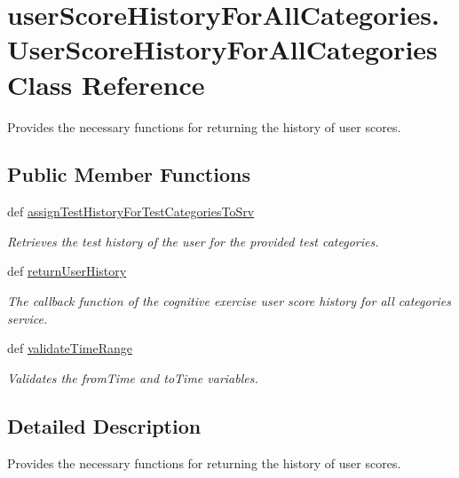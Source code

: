 \hypertarget{classuserScoreHistoryForAllCategories_1_1UserScoreHistoryForAllCategories}{\section{user\-Score\-History\-For\-All\-Categories.\-User\-Score\-History\-For\-All\-Categories Class Reference}
\label{classuserScoreHistoryForAllCategories_1_1UserScoreHistoryForAllCategories}
}


Provides the necessary functions for returning the history of user scores.  


\subsection*{Public Member Functions}
\begin{DoxyCompactItemize}
\item 
def \hyperlink{classuserScoreHistoryForAllCategories_1_1UserScoreHistoryForAllCategories_a53ff38dc9793d099309aec998eeb3745}{assign\-Test\-History\-For\-Test\-Categories\-To\-Srv}
\begin{DoxyCompactList}\small\item\em Retrieves the test history of the user for the provided test categories. \end{DoxyCompactList}\item 
def \hyperlink{classuserScoreHistoryForAllCategories_1_1UserScoreHistoryForAllCategories_afec98a890e1b34dcd2fd89ce6e422d83}{return\-User\-History}
\begin{DoxyCompactList}\small\item\em The callback function of the cognitive exercise user score history for all categories service. \end{DoxyCompactList}\item 
def \hyperlink{classuserScoreHistoryForAllCategories_1_1UserScoreHistoryForAllCategories_a226888e324ec3a8867ffa47530acd073}{validate\-Time\-Range}
\begin{DoxyCompactList}\small\item\em Validates the from\-Time and to\-Time variables. \end{DoxyCompactList}\end{DoxyCompactItemize}


\subsection{Detailed Description}
Provides the necessary functions for returning the history of user scores. 

